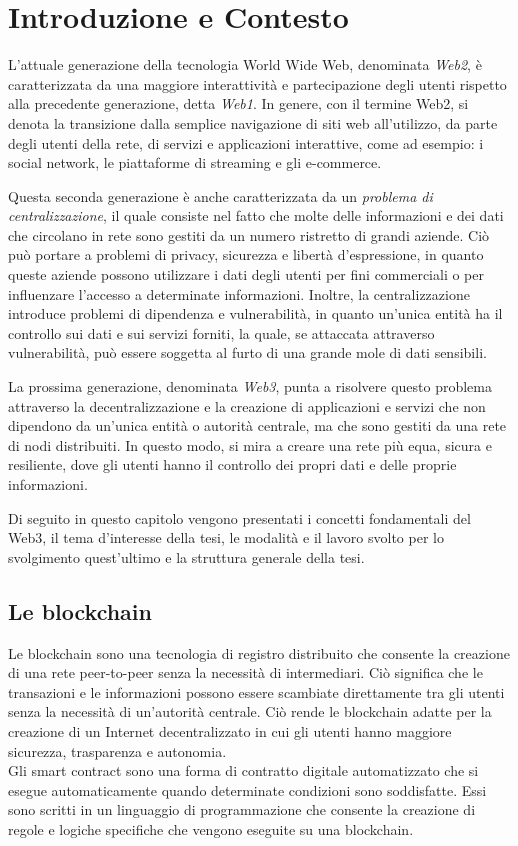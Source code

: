 \chapter{Introduzione e Contesto}
L'attuale generazione della tecnologia World Wide Web, denominata \textit{Web2}, è caratterizzata da una maggiore interattività e partecipazione degli utenti rispetto alla precedente generazione, detta \textit{Web1}. In genere, con il termine Web2, si denota la transizione dalla semplice navigazione di siti web all'utilizzo, da parte degli utenti della rete, di servizi e applicazioni interattive, come ad esempio: i social network, le piattaforme di streaming e gli e-commerce.

Questa seconda generazione è anche caratterizzata da un \textit{problema di centralizzazione}, il quale consiste nel fatto che molte delle informazioni e dei dati che circolano in rete sono gestiti da un numero ristretto di grandi aziende. Ciò può portare a problemi di privacy, sicurezza e libertà d'espressione, in quanto queste aziende possono utilizzare i dati degli utenti per fini commerciali o per influenzare l'accesso a determinate informazioni. Inoltre, la centralizzazione introduce problemi di dipendenza e vulnerabilità, in quanto un'unica entità ha il controllo sui dati e sui servizi forniti, la quale, se attaccata attraverso vulnerabilità, può essere soggetta al furto di una grande mole di dati sensibili.

La prossima generazione, denominata \textit{Web3}, punta a risolvere questo problema attraverso la decentralizzazione e la creazione di applicazioni e servizi che non dipendono da un'unica entità o autorità centrale, ma che sono gestiti da una rete di nodi distribuiti. In questo modo, si mira a creare una rete più equa, sicura e resiliente, dove gli utenti hanno il controllo dei propri dati e delle proprie informazioni.

Di seguito in questo capitolo vengono presentati i concetti fondamentali del Web3, il tema d'interesse della tesi, le modalità e il lavoro svolto per lo svolgimento quest'ultimo e la struttura generale della tesi.
\section{Le blockchain}
Le blockchain sono una tecnologia di registro distribuito che consente la creazione di una rete peer-to-peer senza la necessità di intermediari. Ciò significa che le transazioni e le informazioni possono essere scambiate direttamente tra gli utenti senza la necessità di un'autorità centrale. Ciò rende le blockchain adatte per la creazione di un Internet decentralizzato in cui gli utenti hanno maggiore sicurezza, trasparenza e autonomia.\\
Gli smart contract sono una forma di contratto digitale automatizzato che si esegue automaticamente quando determinate condizioni sono soddisfatte. Essi sono scritti in un linguaggio di programmazione che consente la creazione di regole e logiche specifiche che vengono eseguite su una blockchain.

